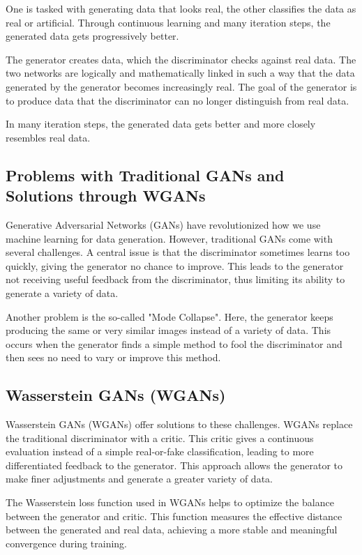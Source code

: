 \documentclass[a4paper, 12pt]{article}
\begin{document}
One is tasked with generating data that looks real, the other classifies the data as real or artificial. Through continuous learning and many iteration steps, the generated data gets progressively better.\cite{youtube_gans}

The generator creates data, which the discriminator checks against real data. The two networks are logically and mathematically linked in such a way that the data generated by the generator becomes increasingly real. The goal of the generator is to produce data that the discriminator can no longer distinguish from real data.\cite{youtube_gans}

In many iteration steps, the generated data gets better and more closely resembles real data.

\subsection{Problems with Traditional GANs and Solutions through WGANs}
Generative Adversarial Networks (GANs) have revolutionized how we use machine learning for data generation. However, traditional GANs come with several challenges. A central issue is that the discriminator sometimes learns too quickly, giving the generator no chance to improve. This leads to the generator not receiving useful feedback from the discriminator, thus limiting its ability to generate a variety of data.\cite{mathworks_gan_training}

Another problem is the so-called "Mode Collapse"\cite{mathworks_gan_training}. Here, the generator keeps producing the same or very similar images instead of a variety of data. This occurs when the generator finds a simple method to fool the discriminator and then sees no need to vary or improve this method.

\subsection{Wasserstein GANs (WGANs)}
Wasserstein GANs (WGANs) offer solutions to these challenges.\cite{ar5iv_dynamic_discriminator}\cite{ar5iv_contrastive_discriminator} WGANs replace the traditional discriminator with a critic. This critic gives a continuous evaluation instead of a simple real-or-fake classification, leading to more differentiated feedback to the generator. This approach allows the generator to make finer adjustments and generate a greater variety of data.

The Wasserstein loss function used in WGANs helps to optimize the balance between the generator and critic. This function measures the effective distance between the generated and real data, achieving a more stable and meaningful convergence during training.
\end{document}
